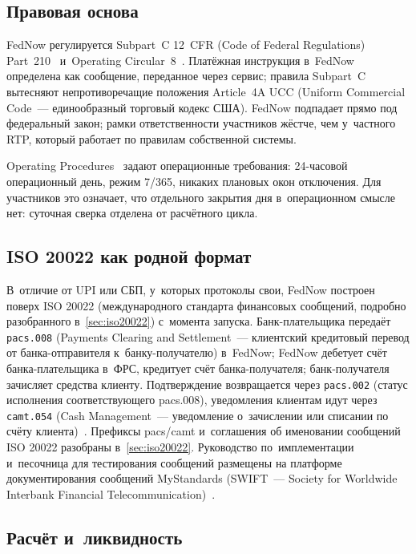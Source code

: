 \subsection*{Правовая основа}\label{subsec:fednow-legal}

FedNow регулируется Subpart~C 12~CFR (Code of Federal Regulations)
Part~210~\cite{reg-j-subpart-c} и~Operating Circular~8~\cite{fednow-oc8}.
Платёжная инструкция в~FedNow определена как сообщение, переданное
через сервис; правила Subpart~C вытесняют непротиворечащие положения
Article~4A UCC (Uniform Commercial Code~--- единообразный торговый
кодекс США). FedNow подпадает
прямо под федеральный закон; рамки ответственности участников
жёстче, чем у~частного RTP, который работает по правилам собственной
системы.

Operating Procedures~\cite{fednow-op-procedures} задают операционные
требования: 24-часовой операционный день, режим 7/365, никаких
плановых окон отключения. Для участников это означает, что отдельного
закрытия дня в~операционном смысле нет: суточная сверка отделена
от расчётного цикла.

\subsection*{ISO 20022 как родной формат}\label{subsec:fednow-iso20022}

В~отличие от UPI или СБП, у~которых протоколы свои, FedNow построен
поверх ISO 20022 (международного стандарта финансовых сообщений,
подробно разобранного в~\ref{sec:iso20022}) с~момента запуска.
Банк-плательщика передаёт \texttt{pacs.008} (Payments Clearing and
Settlement~--- клиентский кредитовый перевод от банка-отправителя
к~банку-получателю) в~FedNow; FedNow дебетует счёт банка-плательщика
в~ФРС, кредитует счёт банка-получателя; банк-получателя зачисляет
средства клиенту. Подтверждение возвращается через \texttt{pacs.002}
(статус исполнения соответствующего pacs.008), уведомления клиентам
идут через \texttt{camt.054} (Cash Management~--- уведомление о~зачислении
или списании по счёту клиента)~\cite{fednow-iso20022}. Префиксы pacs/camt
и~соглашения об именовании сообщений ISO 20022 разобраны в~\ref{sec:iso20022}.
Руководство по~имплементации и~песочница для тестирования сообщений
размещены на платформе документирования сообщений MyStandards (SWIFT~---
Society for Worldwide Interbank Financial Telecommunication)~\cite{fednow-tech-overview}.

\subsection*{Расчёт и~ликвидность}\label{subsec:fednow-settlement}

